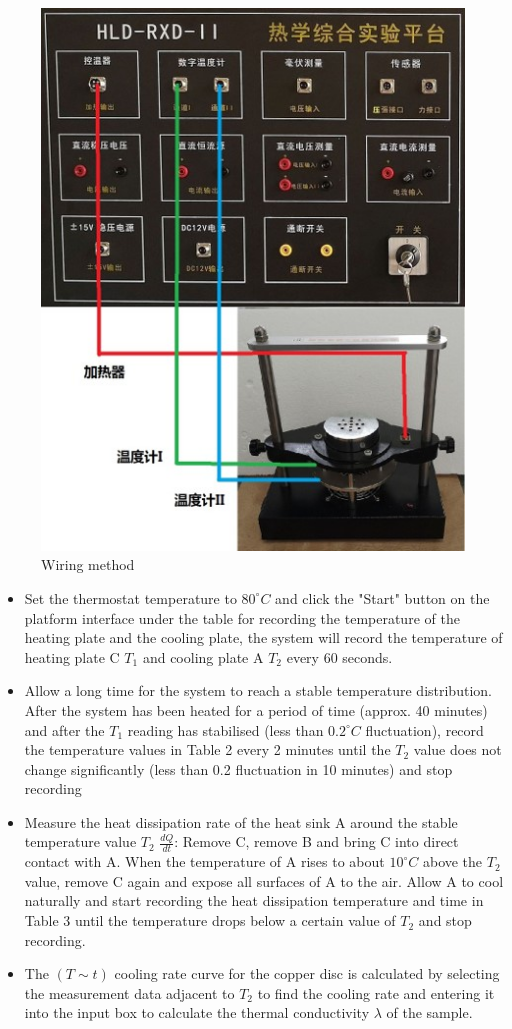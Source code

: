 \documentclass[UTF8]{article}
\begin{document}
\begin{figure}[H]
\begin{minipage}[t]{0.5\linewidth}
     		\includegraphics[clip,scale=0.5]{fig/fig10.jpg}
     		\caption{Wiring method}
     		\label{figure.9}
     	\end{minipage}
     \end{figure}
	\begin{itemize}
		\item Set the thermostat temperature to $80^{\circ} C$ and click the "Start" button on the platform interface under the table for recording the temperature of the heating plate and the cooling plate, the system will record the temperature of heating plate C $T_{1}$ and cooling plate A $T_{2}$ every 60 seconds.
		\item Allow a long time for the system to reach a stable temperature distribution. After the system has been heated for a period of time (approx. 40 minutes) and after the $T_{1}$ reading has stabilised (less than $0.2^{\circ} C$ fluctuation), record the temperature values in Table 2 every 2 minutes until the $T_{2}$ value does not change significantly (less than 0.2 fluctuation in 10 minutes) and stop recording
		\item Measure the heat dissipation rate of the heat sink A around the stable temperature value $T_{2}$ $\frac{dQ}{dt} $: Remove C, remove B and bring C into direct contact with A. When the temperature of A rises to about $10^{\circ} C$ above the $T_{2}$ value, remove C again and expose all surfaces of A to the air. Allow A to cool naturally and start recording the heat dissipation temperature and time in Table 3 until the temperature drops below a certain value of $T_{2}$ and stop recording.
		\item The $\left ( T\sim t \right ) $ cooling rate curve for the copper disc is calculated by selecting the measurement data adjacent to $T_{2}$ to find the cooling rate and entering it into the input box to calculate the thermal conductivity $\lambda $ of the sample.
	\end{itemize}
\end{document}
